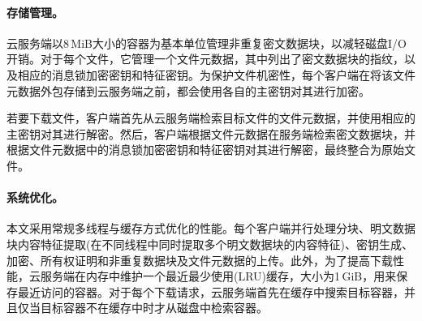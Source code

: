 \paragraph*{存储管理。}
云服务端以8\,MiB大小的容器为基本单位管理非重复密文数据块，以减轻磁盘I/O开销。对于每个文件，它管理一个文件元数据，其中列出了密文数据块的指纹，以及相应的消息锁加密密钥和特征密钥。为保护文件机密性，每个客户端在将该文件元数据外包存储到云服务端之前，都会使用各自的主密钥对其进行加密。

若要下载文件，客户端首先从云服务端检索目标文件的文件元数据，并使用相应的主密钥对其进行解密。然后，客户端根据文件元数据在服务端检索密文数据块，并根据文件元数据中的消息锁加密密钥和特征密钥对其进行解密，最终整合为原始文件。

\paragraph*{系统优化。}
本文采用常规多线程与缓存方式优化\prototype 的性能。每个客户端并行处理分块、明文数据块内容特征提取(在不同线程中同时提取多个明文数据块的内容特征)、密钥生成、加密、所有权证明和非重复数据块及文件元数据的上传。此外，为了提高下载性能，云服务端在内存中维护一个最近最少使用(LRU)缓存，大小为1\,GiB，用来保存最近访问的容器。对于每个下载请求，云服务端首先在缓存中搜索目标容器，并且仅当目标容器不在缓存中时才从磁盘中检索容器。